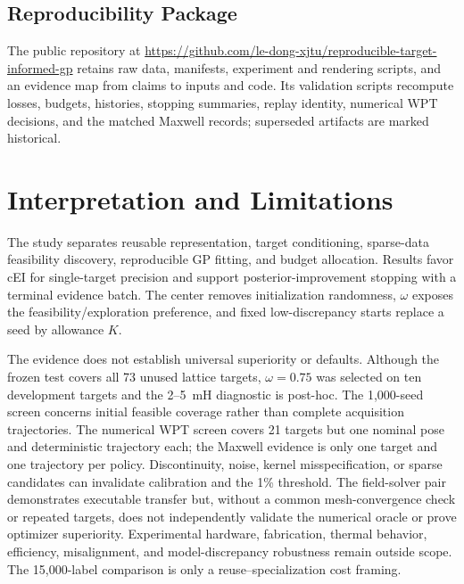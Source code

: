 \documentclass[conference]{IEEEtran}
\begin{document}
\subsection{Reproducibility Package}
The public repository at \url{https://github.com/le-dong-xjtu/reproducible-target-informed-gp} retains raw data, manifests, experiment and rendering scripts, and an evidence map from claims to inputs and code. Its validation scripts recompute losses, budgets, histories, stopping summaries, replay identity, numerical WPT decisions, and the matched Maxwell records; superseded artifacts are marked historical.

\section{Interpretation and Limitations}
The study separates reusable representation, target conditioning, sparse-data feasibility discovery, reproducible GP fitting, and budget allocation. Results favor cEI for single-target precision and support posterior-improvement stopping with a terminal evidence batch. The center removes initialization randomness, $\omega$ exposes the feasibility/exploration preference, and fixed low-discrepancy starts replace a seed by allowance $K$.

The evidence does not establish universal superiority or defaults. Although the frozen test covers all 73 unused lattice targets, $\omega=0.75$ was selected on ten development targets and the 2--5~mH diagnostic is post-hoc. The 1,000-seed screen concerns initial feasible coverage rather than complete acquisition trajectories. The numerical WPT screen covers 21 targets but one nominal pose and deterministic trajectory each; the Maxwell evidence is only one target and one trajectory per policy. Discontinuity, noise, kernel misspecification, or sparse candidates can invalidate calibration and the 1\% threshold. The field-solver pair demonstrates executable transfer but, without a common mesh-convergence check or repeated targets, does not independently validate the numerical oracle or prove optimizer superiority. Experimental hardware, fabrication, thermal behavior, efficiency, misalignment, and model-discrepancy robustness remain outside scope. The 15,000-label comparison is only a reuse--specialization cost framing.
\end{document}
